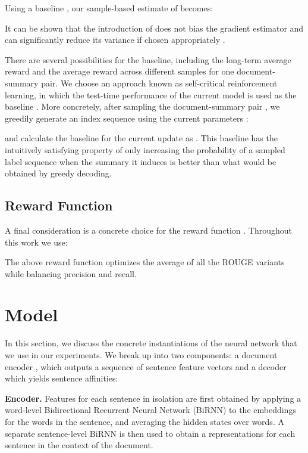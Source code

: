\documentclass[11pt,a4paper]{article}
\begin{document}
Using a baseline , our sample-based estimate of  becomes:

It can be shown that the introduction of  does not bias the gradient estimator and can significantly reduce its variance if chosen appropriately \citep{sutton2000policy}. 

There are several possibilities for the baseline, including the long-term average reward and the average reward across different samples for one document-summary pair. We choose an approach known as self-critical reinforcement learning, in which the test-time performance of the current model is used as the baseline \citep{Ranzato2015SequenceLT,rennie2017self,abs5_paulus2017deep}. More concretely, after sampling the document-summary pair , we greedily generate an index sequence using the current parameters :

and calculate the baseline for the current update as . This baseline has the intuitively satisfying property of only increasing the probability of a sampled label sequence when the summary it induces is better than what would be obtained by greedy decoding. 

\subsection{Reward Function}
A final consideration is a concrete choice for the reward function . Throughout this work we use:

The above reward function optimizes the average of all the ROUGE variants \cite{eva1_lin:2004:ACLsummarization} while balancing precision and recall. 


\section{Model\label{sec:model}}
In this section, we discuss the concrete instantiations of the neural network  that we use in our experiments. We break  up into two components: a document encoder , which outputs a sequence of sentence feature vectors  and a decoder  which yields sentence affinities:



\noindent \textbf{Encoder.} Features for each sentence in isolation are first obtained by applying a word-level Bidirectional Recurrent Neural Network (BiRNN) to the embeddings for the words in the sentence, and averaging the hidden states over words. A separate sentence-level BiRNN is then used to obtain a representations  for each sentence in the context of the document.
\end{document}
